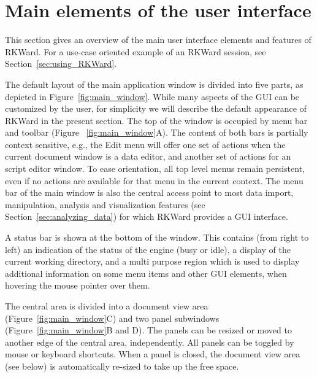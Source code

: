 \section{Main elements of the user interface}
\label{sec:user_interface}
This section gives an overview of the main user interface elements and features of RKWard.
For a use-case oriented example of an RKWard session, see Section~\ref{sec:using_RKWard}.

The default layout of the main application window is divided into five
parts, as depicted in Figure~\ref{fig:main_window}. While many aspects
of the GUI can be customized by the user, for simplicity we will
describe the default appearance of RKWard in the present section. The
top of the window is occupied by menu bar and toolbar (Figure~
\ref{fig:main_window}A). The content of both bars is partially context
sensitive, e.g., the Edit menu will offer
one set of actions when the current document window is a data editor,
and another set of actions for an  script
editor window. To ease orientation, all top level menus remain
persistent, even if no actions are available for that menu in the
current context. The menu bar of the main window is also the central
access point to most data import, manipulation, analysis and
visualization features (see Section~\ref{sec:analyzing_data}) for which RKWard provides a GUI
interface.

A status bar is shown at the bottom of the window. This contains (from
right to left) an indication of the status of the
 engine (busy or idle), a display of the
current working directory, and a multi purpose region which is used to
display additional information on some menu items and other GUI
elements, when hovering the mouse pointer over them.

The central area is divided into a document view area
(Figure~\ref{fig:main_window}C) and two panel subwindows
(Figure~\ref{fig:main_window}B and D). The panels can be resized or moved to
another edge of the central area, independently. All panels can be
toggled by mouse or keyboard shortcuts. When a panel is closed, the
document view area (see below) is automatically re-sized to take up the
free space.

